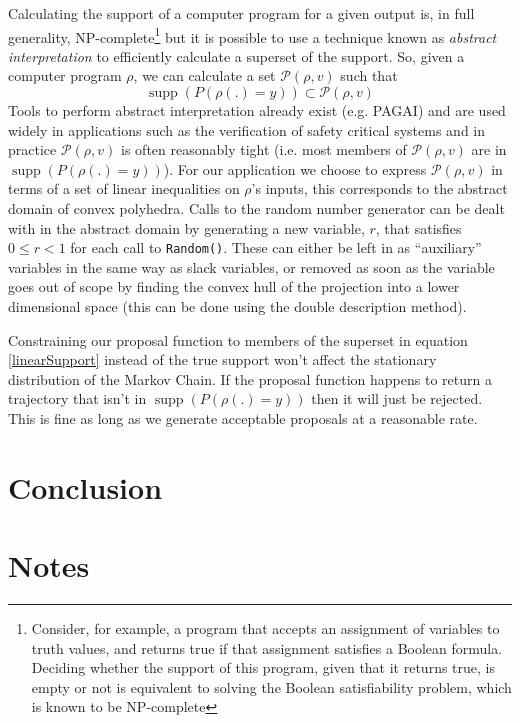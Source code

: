 \documentclass{article}
\DeclareMathOperator\supp{supp}
\begin{document}
Calculating the support of a computer program for a given output is, in full generality, NP-complete\footnote{Consider, for example, a program that accepts an assignment of variables to truth values, and returns true if that assignment satisfies a Boolean formula. Deciding whether the support of this program, given that it returns true, is empty or not is equivalent to solving the Boolean satisfiability problem, which is known to be NP-complete\cite{cook1971complexity}} but it is possible to use a technique known as \textit{abstract interpretation}\cite{cousot1977abstract} to efficiently calculate a superset of the support. So, given a computer program $\rho$, we can calculate a set $\mathcal{P}(\rho, v)$ such that
\[
\supp(P(\rho(.)=y)) \subset \mathcal{P}(\rho, v)
\]
Tools to perform abstract interpretation already exist (e.g. PAGAI\cite{henry2012pagai}) and are used widely in applications such as the verification of safety critical systems\cite{blanchet2003static} and in practice $\mathcal{P}(\rho, v)$ is often reasonably tight (i.e. most members of $\mathcal{P}(\rho, v)$ are in $\supp(P(\rho(.)=y))$). For our application we choose to express $\mathcal{P}(\rho, v)$ in terms of a set of linear inequalities on $\rho$'s inputs, this corresponds to the abstract domain of convex polyhedra\cite{cousot1978automatic}\cite{becchi2018efficient}. Calls to the random number generator can be dealt with in the abstract domain by generating a new variable, $r$, that satisfies $0 \le r < 1$ for each call to \texttt{Random()}. These can either be left in as ``auxiliary'' variables in the same way as slack variables, or removed as soon as the variable goes out of scope by finding the convex hull of the projection into a lower dimensional space (this can be done using the double description method\cite{motzkin1953double}).


Constraining our proposal function to members of the superset in equation \ref{linearSupport} instead of the true support won't affect the stationary distribution of the Markov Chain. If the proposal function happens to return a trajectory that isn't in $\supp(P(\rho(.)=y))$ then it will just be rejected. This is fine as long as we generate acceptable proposals at a reasonable rate.

\section{Conclusion}

\section{Notes}
\end{document}
